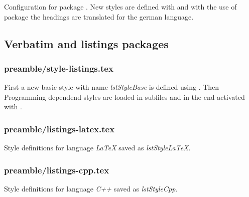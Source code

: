 Configuration for package . New styles are defined with  and with the use of package  the headings are translated for the german language.


\subsection{Verbatim and listings packages}


\subsubsection{preamble/style-listings.tex}

First a new basic style with name \emph{lstStyleBase} is defined using . Then Programming dependend styles are loaded in subfiles and in the end activated with .


\subsubsection{preamble/listings-latex.tex}

Style definitions for language \emph{LaTeX} saved as \emph{lstStyleLaTeX}.


\subsubsection{preamble/listings-cpp.tex}

Style definitions for language \emph{C++} saved as \emph{lstStyleCpp}.



